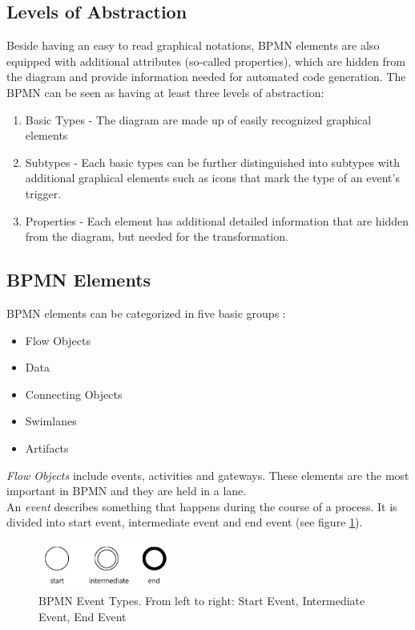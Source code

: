 \subsection{Levels of Abstraction}
Beside having an easy to read graphical notations, BPMN elements are also equipped with additional attributes (so-called properties), which are hidden from the diagram and provide information needed for automated code generation. The BPMN can be seen as having at least three levels of abstraction:
\begin{enumerate}
	\item Basic Types - The diagram are made up of easily recognized graphical elements
	\item Subtypes - Each basic types can be further distinguished into subtypes with additional graphical elements such as icons that mark the type of an event's trigger.
	\item Properties - Each element has additional detailed information that are hidden from the diagram, but needed for the transformation.
\end{enumerate}


\subsection{BPMN Elements}
BPMN elements can be categorized in five basic groups \cite{BPMN2}:
\begin{itemize}
	\item Flow Objects
	\item Data
	\item Connecting Objects
	\item Swimlanes
	\item Artifacts
\end{itemize}
\textit{Flow Objects} include events, activities and gateways. These elements are the most important in BPMN and they are held in a lane.\\

An \textit{event} describes something that happens during the course of a process. It is divided into start event, intermediate event and end event (see figure \ref{fig:events}).\\
\begin{figure}[h]
	\centering
	\includegraphics[width=0.4\textwidth]{images/events.png}
	\caption{BPMN Event Types. From left to right: Start Event, Intermediate Event, End Event}
	\label{fig:events}
\end{figure}

